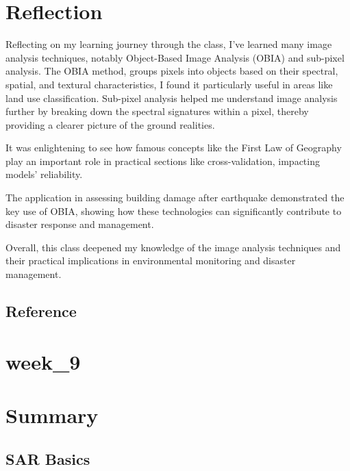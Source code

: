 \documentclass[
  letterpaper,
  DIV=11,
  numbers=noendperiod]{scrreprt}
\begin{document}

\chapter{Reflection}\label{reflection-4}

Reflecting on my learning journey through the class, I've learned many
image analysis techniques, notably Object-Based Image Analysis (OBIA)
and sub-pixel analysis. The OBIA method, groups pixels into objects
based on their spectral, spatial, and textural characteristics, I found
it particularly useful in areas like land use classification. Sub-pixel
analysis helped me understand image analysis further by breaking down
the spectral signatures within a pixel, thereby providing a clearer
picture of the ground realities.

It was enlightening to see how famous concepts like the First Law of
Geography play an important role in practical sections like
cross-validation, impacting models' reliability.

The application in assessing building damage after earthquake
demonstrated the key use of OBIA, showing how these technologies can
significantly contribute to disaster response and management.

Overall, this class deepened my knowledge of the image analysis
techniques and their practical implications in environmental monitoring
and disaster management.

\section{\texorpdfstring{\textbf{Reference}}{Reference}}\label{reference-1}


\chapter{week\_9}\label{week_9}


\chapter{Summary}\label{summary-3}

\section{SAR Basics}\label{sar-basics}
\end{document}
